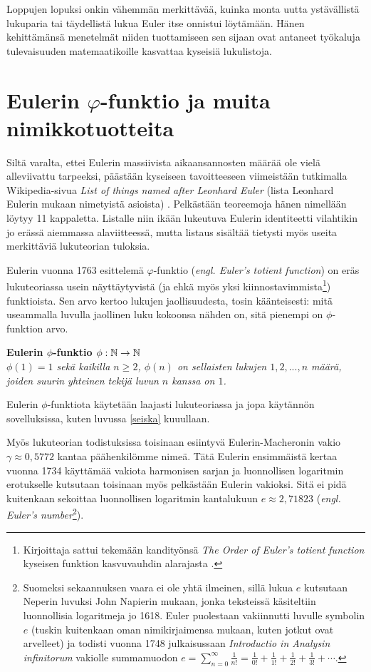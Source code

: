 \documentclass[a4paper,11pt]{article}
\begin{document}
Loppujen lopuksi onkin vähemmän merkittävää, kuinka monta uutta ystävällistä lukuparia tai täydellistä lukua Euler itse onnistui löytämään. Hänen kehittämänsä menetelmät niiden tuottamiseen sen sijaan ovat antaneet työkaluja tulevaisuuden matemaatikoille kasvattaa kyseisiä lukulistoja.

\section{Eulerin $\varphi$-funktio ja muita nimikkotuotteita}
\label{neloi}

Siltä varalta, ettei Eulerin massiivista aikaansannosten määrää ole vielä alleviivattu tarpeeksi, päästään kyseiseen tavoitteeseen viimeistään tutkimalla Wikipedia-sivua \textit{List of things named after Leonhard Euler} (lista Leonhard Eulerin mukaan nimetyistä asioista) \cite{listofthings}. Pelkästään teoreemoja hänen nimellään löytyy 11 kappaletta. Listalle niin ikään lukeutuva Eulerin identiteetti vilahtikin jo erässä aiemmassa alaviitteessä, mutta listaus sisältää tietysti myös useita merkittäviä lukuteorian tuloksia.

Eulerin vuonna 1763 esittelemä $\varphi$-funktio (\textit{engl. Euler's totient function}) \cite{totient} on eräs lukuteoriassa usein näyttäytyvistä (ja ehkä myös yksi kiinnostavimmista\footnote{Kirjoittaja sattui tekemään kandityönsä \textit{The Order of Euler's totient function} kyseisen funktion kasvuvauhdin alarajasta \cite{kandi}.}) funktioista. Sen arvo kertoo lukujen jaollisuudesta, tosin käänteisesti: mitä useammalla luvulla jaollinen luku kokoonsa nähden on, sitä pienempi on $\phi$-funktion arvo.

\begin{center}
    \textbf{Eulerin $\phi$-funktio $\phi: \mathbb{N} \rightarrow \mathbb{N}$}\\
    \textit{$\phi(1)=1$ sekä kaikilla $n\geq2$, $\phi(n)$ on sellaisten lukujen $1,2,...,n$ määrä, joiden suurin yhteinen tekijä luvun $n$ kanssa on $1$.}
\end{center}

Eulerin $\phi$-funktiota käytetään laajasti lukuteoriassa ja jopa käytännön sovelluksissa, kuten luvussa \ref{seiska} kuuullaan. 

Myös lukuteorian todistuksissa toisinaan esiintyvä Eulerin-Macheronin vakio $\gamma\approx0,5772$ kantaa päähenkilömme nimeä. Tätä Eulerin ensimmäistä kertaa vuonna 1734 käyttämää vakiota harmonisen sarjan ja luonnollisen logaritmin erotukselle kutsutaan toisinaan myös pelkästään Eulerin vakioksi. Sitä ei pidä kuitenkaan sekoittaa luonnollisen logaritmin kantalukuun $e\approx2,71823$ (\textit{engl. Euler's number}\footnote{Suomeksi sekaannuksen vaara ei ole yhtä ilmeinen, sillä lukua $e$ kutsutaan Neperin luvuksi John Napierin mukaan, jonka teksteissä käsiteltiin luonnollisia logaritmeja jo 1618. Euler puolestaan vakiinnutti luvulle symbolin $e$ (tuskin kuitenkaan oman nimikirjaimensa mukaan, kuten jotkut ovat arvelleet) ja todisti vuonna 1748 julkaisussaan \textit{Introductio in Analysin infinitorum} vakiolle summamuodon
$e = \sum_{n=0}^\infty\frac{1}{n!}=\frac{1}{0!}+\frac{1}{1!}+\frac{1}{2!}+\frac{1}{3!}+\cdots$\cite{neperinluku}.}).
\end{document}
